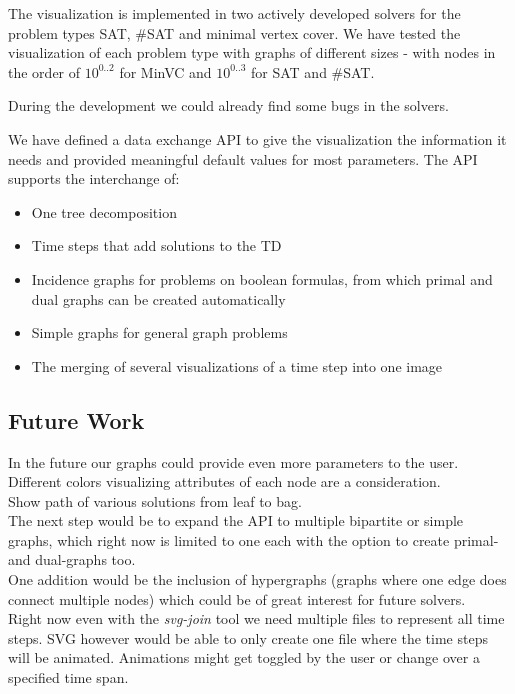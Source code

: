 \documentclass[a4paper, 12pt, bibliography=totoc]{scrartcl}
\begin{document}
The visualization is implemented in two actively developed solvers for the problem types {SAT}, {\#SAT} and {minimal vertex cover}. We have tested the visualization of each problem type with graphs of different sizes - with nodes in the order of $10^{0..2}$ for MinVC and $10^{0..3}$ for SAT and \#SAT.

During the development we could already find some bugs in the solvers.

We have defined a data exchange API to give the visualization the information it needs and provided meaningful default values for most parameters. The API supports the interchange of:
\begin{itemize}
	\item One tree decomposition
	\item Time steps that add solutions to the TD
	\item Incidence graphs for problems on boolean formulas, from which primal and dual graphs can be created automatically
	\item Simple graphs for general graph problems
	\item The merging of several visualizations of a time step into one image
\end{itemize}

\subsection{Future Work}
In the future our graphs could provide even more parameters to the user. \\
Different colors visualizing attributes of each node are a consideration.\\
Show path of various solutions from leaf to bag. \\
The next step would be to expand the API to multiple bipartite or simple graphs, which right now is limited to one each with the option to create primal- and dual-graphs too.\\
One addition would be the inclusion of hypergraphs (graphs where one edge does connect multiple nodes) which could be of great interest for future solvers.\\
Right now even with the \textit{svg-join} tool we need multiple files to represent all time steps. SVG however would be able to only create one file where the time steps will be animated. Animations might get toggled by the user or change over a specified time span.\\
\end{document}
